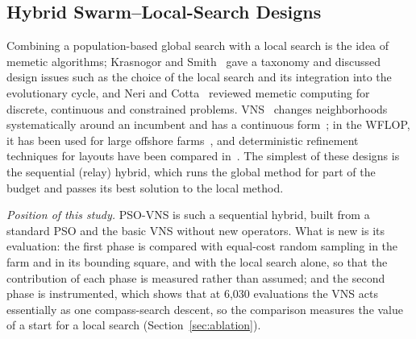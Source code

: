 \subsection{Hybrid Swarm--Local-Search Designs}
\label{sec:related-hybrid}
Combining a population-based global search with a local search is the idea of memetic algorithms; Krasnogor and Smith~\cite{Krasnogor2005} gave a taxonomy and discussed design issues such as the choice of the local search and its integration into the evolutionary cycle, and Neri and Cotta~\cite{Neri2012} reviewed memetic computing for discrete, continuous and constrained problems. VNS~\cite{Mladenovic1997,Hansen2001} changes neighborhoods systematically around an incumbent and has a continuous form~\cite{Mladenovic2008}; in the WFLOP, it has been used for large offshore farms~\cite{Cazzaro2022}, and deterministic refinement techniques for layouts have been compared in~\cite{Nagpal2021}. The simplest of these designs is the sequential (relay) hybrid, which runs the global method for part of the budget and passes its best solution to the local method.

\emph{Position of this study.} PSO-VNS is such a sequential hybrid, built from a standard PSO and the basic VNS without new operators. What is new is its evaluation: the first phase is compared with equal-cost random sampling in the farm and in its bounding square, and with the local search alone, so that the contribution of each phase is measured rather than assumed; and the second phase is instrumented, which shows that at 6,030 evaluations the VNS acts essentially as one compass-search descent, so the comparison measures the value of a start for a local search (Section~\ref{sec:ablation}).

